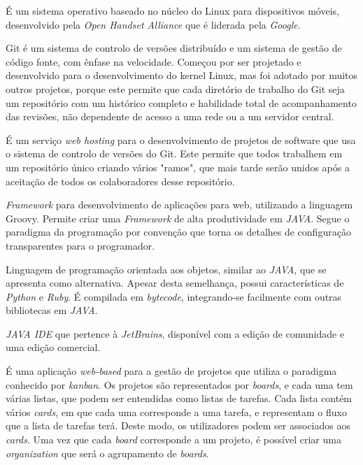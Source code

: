 \begin{glossary}

É um sistema operativo baseado no núcleo do Linux para dispositivos móveis, desenvolvido pela \textit{Open Handset Alliance} que é liderada pela \textit{Google}.

Git é um sistema de controlo de versões distribuído e um sistema de gestão de código fonte, com ênfase na velocidade. Começou por ser projetado e desenvolvido para o desenvolvimento do kernel Linux, mas foi adotado por muitos outros projetos, porque este permite que cada diretório de trabalho do Git seja um repositório com um histórico completo e habilidade total de acompanhamento das revisões, não dependente de acesso a uma rede ou a um servidor central.

É um serviço \textit{web hosting} para o desenvolvimento de projetos de software que usa o sistema de controlo de versões do Git. Este permite que todos trabalhem em um repositório único criando vários "ramos", que mais tarde serão unidos após a aceitação de todos os colaboradores desse repositório.

\textit{Framework} para desenvolvimento de aplicações para web, utilizando a linguagem Groovy. Permite criar uma \textit{Framework} de alta produtividade em \textit{JAVA}. Segue o paradigma da programação por convenção que torna os detalhes de configuração transparentes para o programador.

Linguagem de programação orientada aos objetos, similar ao \textit{JAVA}, que se apresenta como alternativa. Apesar desta semelhança, possui características de \textit{Python} e \textit{Ruby}. É compilada em \textit{bytecode}, integrando-se facilmente com outras bibliotecas em \textit{JAVA}.

\textit{JAVA IDE} que pertence à \textit{JetBrains}, disponível com a edição de comunidade e uma edição comercial.

É uma aplicação \textit{web-based} para a gestão de projetos que utiliza o paradigma conhecido por \textit{kanban}. Os projetos são representados por \textit{boards}, e cada uma tem várias listas, que podem ser entendidas como listas de tarefas. Cada lista contém vários \textit{cards}, em que cada uma corresponde a uma tarefa, e representam o fluxo que a lista de tarefas terá. Deste modo, os utilizadores podem ser associados aos \textit{cards}. Uma vez que cada \textit{board} corresponde a um projeto, é possível criar uma \textit{organization} que será o agrupamento de \textit{boards}.

\end{glossary}